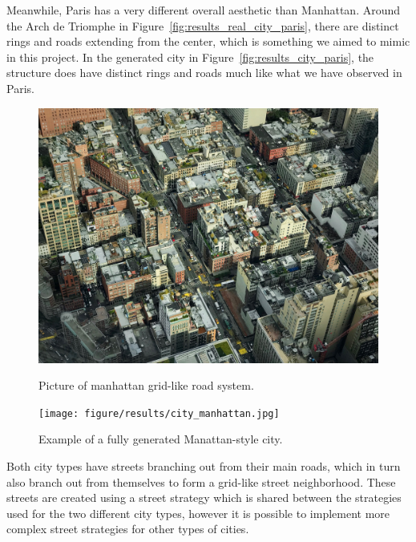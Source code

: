 Meanwhile, Paris has a very different overall aesthetic than Manhattan.
Around the Arch de Triomphe in Figure~\ref{fig:results_real_city_paris}, there are distinct rings and roads extending from the center, which is something we aimed to mimic in this project.
In the generated city in Figure~\ref{fig:results_city_paris}, the structure does have distinct rings and roads much like what we have observed in Paris.

\begin{figure}[H]
  \centering
  \begin{minipage}{.45\textwidth}
    \centering
    \begin{minipage}{.9\textwidth}
      \centering
      \includegraphics[width=\textwidth]{figure/results/manhattan.jpg}
      \caption{Picture of manhattan grid-like road system.}
      \label{fig:results_real_city_manhattan}
    \end{minipage}
  \end{minipage}
  \begin{minipage}{.45\textwidth}
    \begin{minipage}{.9\textwidth}
      \centering
      \centering
      \texttt{[image: figure/results/city\_manhattan.jpg]}
      \caption{Example of a fully generated Manattan-style city.}
      \label{fig:results_city_manhattan}
    \end{minipage}
  \end{minipage}
\end{figure}

Both city types have streets branching out from their main roads, which in turn also branch out from themselves to form a grid-like street neighborhood.
These streets are created using a street strategy which is shared between the strategies used for the two different city types, however it is possible to implement more complex street strategies for other types of cities.

